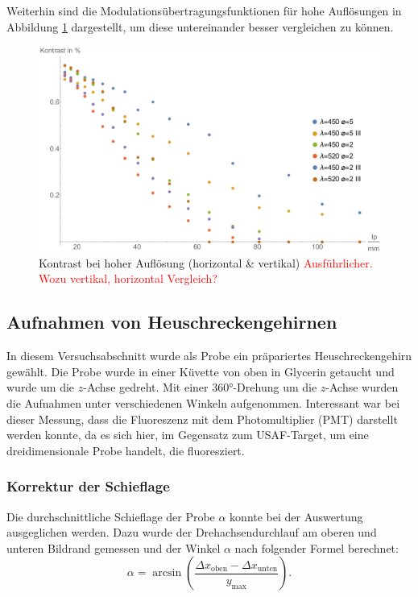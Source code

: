 Weiterhin sind die Modulationsübertragungsfunktionen für hohe Auflösungen in Abbildung \ref{fig:Versuch2_Plot2_all} dargestellt, um diese untereinander besser vergleichen zu können.

\begin{figure}[H]
\centering
\includegraphics[width=1.0\linewidth]{IMAGE/Versuch2Plot2_all.pdf}
	\caption{Kontrast bei hoher Auflösung (horizontal \& vertikal) \textcolor{red}{Ausführlicher. Wozu vertikal, horizontal Vergleich?}}
	\label{fig:Versuch2_Plot2_all}
\end{figure}



\subsection{Aufnahmen von Heuschreckengehirnen}
In diesem Versuchsabschnitt wurde als Probe ein präpariertes Heuschreckengehirn gewählt.
Die Probe wurde in einer Küvette von oben in Glycerin getaucht und wurde um die $z$-Achse gedreht.
Mit einer 360°-Drehung um die $z$-Achse wurden die Aufnahmen unter verschiedenen Winkeln aufgenommen.
Interessant war bei dieser Messung, dass die Fluoreszenz mit dem Photomultiplier (PMT) darstellt werden konnte, da es sich hier, im Gegensatz zum USAF-Target, um eine dreidimensionale Probe handelt, die fluoresziert.

\subsubsection{Korrektur der Schieflage}
Die durchschnittliche Schieflage der Probe $\alpha$ konnte bei der Auswertung ausgeglichen werden.
Dazu wurde der Drehachsendurchlauf am oberen und unteren Bildrand gemessen und der Winkel $\alpha$ nach folgender Formel berechnet:
$$\alpha = \arcsin \left( \frac{\Delta{x_{\text{oben}}} - \Delta{x_{\text{unten}}}}{y_{\text{max}}} \right) .$$

